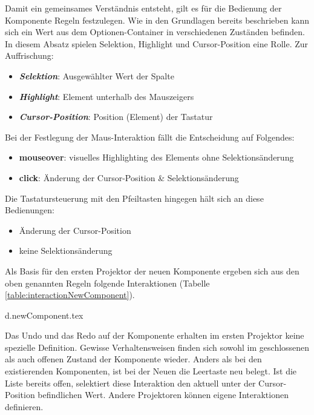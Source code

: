 Damit ein gemeinsames Verständnis entsteht, gilt es für die Bedienung der Komponente Regeln festzulegen. 
Wie in den Grundlagen bereits beschrieben kann sich ein Wert aus dem Optionen-Container in verschiedenen Zuständen befinden. 
In diesem Absatz spielen Selektion, Highlight und Cursor-Position eine Rolle. 
Zur Auffrischung: 

\begin{itemize}
    \item \textbf{\emph{Selektion}}: Ausgewählter Wert der Spalte
    \item \textbf{\emph{Highlight}}: Element unterhalb des Mauszeigers
    \item \textbf{\emph{Cursor-Position}}: Position (Element) der Tastatur
\end{itemize}

\noindent
Bei der Festlegung der Maus-Interaktion fällt die Entscheidung auf Folgendes: 

\begin{itemize}
    \item \textbf{mouseover}: visuelles Highlighting des Elements ohne Selektionsänderung
    \item \textbf{click}: Änderung der Cursor-Position \& Selektionsänderung
\end{itemize}

\noindent
Die Tastatursteuerung mit den Pfeiltasten hingegen hält sich an diese Bedienungen: 

\begin{itemize}
    \item Änderung der Cursor-Position
    \item keine Selektionsänderung
\end{itemize}

\noindent
Als Basis für den ersten Projektor der neuen Komponente ergeben sich aus den oben genannten Regeln folgende Interaktionen (Tabelle \ref{table:interactionNewComponent}). 

{d.newComponent.tex}

Das Undo und das Redo auf der Komponente erhalten im ersten Projektor keine spezielle Definition. 
Gewisse Verhaltensweisen finden sich sowohl im geschlossenen als auch offenen Zustand der Komponente wieder. 
Anders als bei den existierenden Komponenten, ist bei der Neuen die Leertaste neu belegt. 
Ist die Liste bereits offen, selektiert diese Interaktion den aktuell unter der Cursor-Position befindlichen Wert. 
Andere Projektoren können eigene Interaktionen definieren. 


